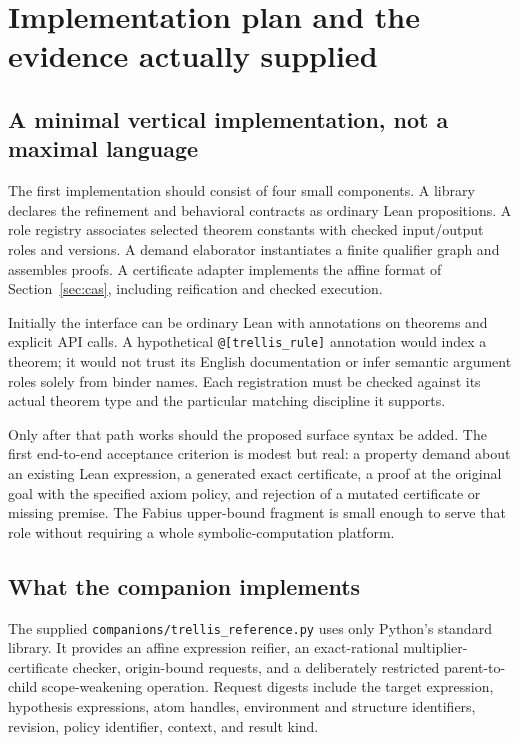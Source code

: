 \documentclass[11pt,a4paper]{article}
\theoremstyle{definition}
\theoremstyle{remark}
\newcommand{\code}[1]{\texttt{#1}}
\begin{document}
\section{Implementation plan and the evidence actually supplied}
\label{sec:implementation}

\subsection{A minimal vertical implementation, not a maximal language}
The first implementation should consist of four small components. A library declares the refinement and behavioral contracts as ordinary Lean propositions. A role registry associates selected theorem constants with checked input/output roles and versions. A demand elaborator instantiates a finite qualifier graph and assembles proofs. A certificate adapter implements the affine format of Section~\ref{sec:cas}, including reification and checked execution.

Initially the interface can be ordinary Lean with annotations on theorems and explicit API calls. A hypothetical \code{@[trellis\_rule]} annotation would index a theorem; it would not trust its English documentation or infer semantic argument roles solely from binder names. Each registration must be checked against its actual theorem type and the particular matching discipline it supports.

Only after that path works should the proposed surface syntax be added. The first end-to-end acceptance criterion is modest but real: a property demand about an existing Lean expression, a generated exact certificate, a proof at the original goal with the specified axiom policy, and rejection of a mutated certificate or missing premise. The Fabius upper-bound fragment is small enough to serve that role without requiring a whole symbolic-computation platform.

\subsection{What the companion implements}
The supplied \code{companions/trellis\_reference.py} uses only Python's standard library. It provides an affine expression reifier, an exact-rational multiplier-certificate checker, origin-bound requests, and a deliberately restricted parent-to-child scope-weakening operation. Request digests include the target expression, hypothesis expressions, atom handles, environment and structure identifiers, revision, policy identifier, context, and result kind.
\end{document}
